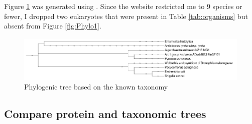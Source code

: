 \documentclass[]{article}
\begin{document}
Figure \ref{fig:Phylo2} was generated using \cite{biobyte2019phylot}. Since the website restricted me to 9 species or fewer, I dropped two eukaryotes that were present in Table \ref{tab:organisms} but absent from Figure \ref{fig:Phylo1}.

\begin{figure}[H]
	\caption{Phylogenic tree based on the known taxonomy}\label{fig:Phylo2}
	\includegraphics[width=\textwidth]{Phylo2}
\end{figure}

\subsection{Compare protein and taxonomic trees}\label{sect:compare}
\end{document}
